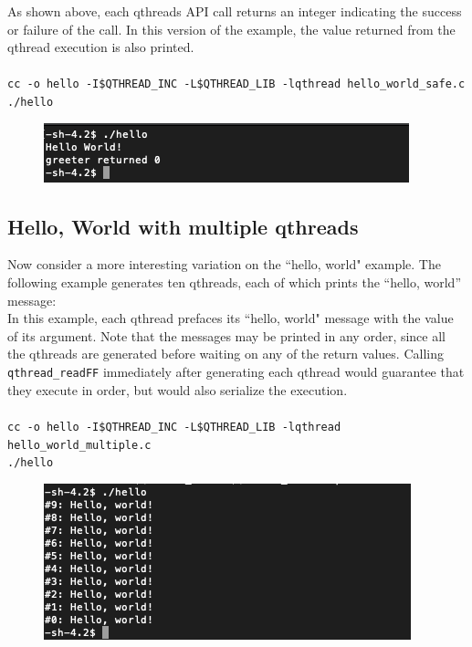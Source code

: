 \documentclass[12pt,fullpage]{article}
\begin{document}
As shown above, each qthreads API call returns an integer indicating the success or failure of the call. In this version of the example, the value returned from the qthread execution is also printed.
\\ \\
{\footnotesize{\tt cc -o hello -I\$QTHREAD\_INC -L\$QTHREAD\_LIB -lqthread hello\_world\_safe.c}}
\\
{\footnotesize{\tt ./hello}}
\begin{figure}
\includegraphics{images/hello_world_safe.png}
\end{figure}


\subsection{Hello, World with multiple qthreads}

Now consider a more interesting variation on the ``hello, world" example.  The following example generates ten qthreads, each of which prints the ``hello, world'' message:
\\


In this example, each qthread prefaces its ``hello, world" message with the value of its argument.  Note that the messages may be printed in any order, since all the qthreads are generated before waiting on any of the return values.  Calling {\tt qthread\_readFF} immediately after generating each qthread would guarantee that they execute in order, but would also serialize the execution.
\\ \\
{\footnotesize{\tt cc -o hello -I\$QTHREAD\_INC -L\$QTHREAD\_LIB -lqthread hello\_world\_multiple.c}}
\\
{\footnotesize{\tt ./hello}}
\begin{figure}
\includegraphics{images/hello_world_multiple.png}
\end{figure}
\end{document}
